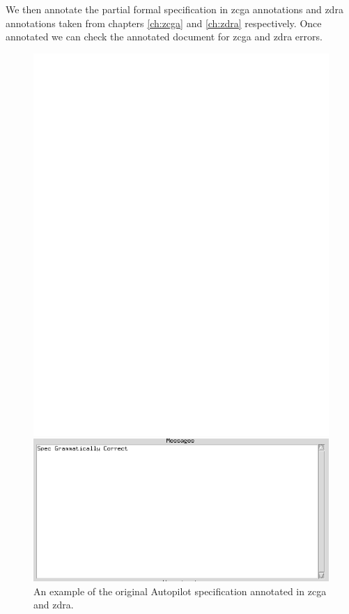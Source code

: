 We then annotate the partial formal specification in \gls{zcga} annotations and
\gls{zdra} annotations taken from chapters \ref{ch:zcga} and \ref{ch:zdra}
respectively. Once annotated we can check the annotated document for \gls{zcga}
and \gls{zdra} errors. 

\begin{figure}[H]
\centering
\begin{minipage}{0.45\textwidth}
\centering
\includegraphics[clip, trim=0cm 8cm 6cm 2cm, scale=0.6]{examples/semiform/1n2.pdf}
\vspace{-0.18in}
\caption{An example of the original Autopilot specification annotated in \gls{zcga} and \gls{zdra}. \label{fig:autopilot1n2}}
\vspace{-0.2in}
\end{minipage}\hfill
\begin{minipage}{0.45\textwidth}
\centering
\includegraphics[clip, trim=0cm 8.5cm 9cm 0cm, scale=0.5]{examples/semiform/zcgacorrect.png}

\end{minipage}
\end{figure}
